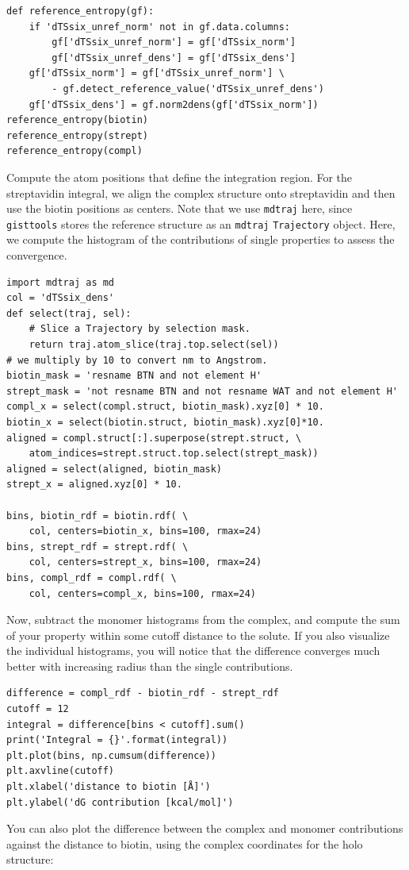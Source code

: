 \documentclass[9pt,tutorial]{livecoms}
\newcommand{\software}{\texttt}
\newcommand\inlinecode{\texttt}
\begin{document}
\begin{lstlisting}[style=python]
def reference_entropy(gf):
    if 'dTSsix_unref_norm' not in gf.data.columns:
        gf['dTSsix_unref_norm'] = gf['dTSsix_norm']
        gf['dTSsix_unref_dens'] = gf['dTSsix_dens']
    gf['dTSsix_norm'] = gf['dTSsix_unref_norm'] \
        - gf.detect_reference_value('dTSsix_unref_dens')
    gf['dTSsix_dens'] = gf.norm2dens(gf['dTSsix_norm'])
reference_entropy(biotin)
reference_entropy(strept)
reference_entropy(compl)
\end{lstlisting}
Compute the atom positions that define the integration region.
For the streptavidin integral, we align the complex structure onto streptavidin and then use the biotin positions as centers. Note that we use \software{mdtraj} here, since \software{gisttools} stores the reference structure as an \software{mdtraj} \inlinecode{Trajectory} object.
Here, we compute the histogram of the contributions of single properties to assess the convergence.

\begin{lstlisting}[style=python]
import mdtraj as md
col = 'dTSsix_dens'
def select(traj, sel):
    # Slice a Trajectory by selection mask.
    return traj.atom_slice(traj.top.select(sel))
# we multiply by 10 to convert nm to Angstrom.
biotin_mask = 'resname BTN and not element H'
strept_mask = 'not resname BTN and not resname WAT and not element H'
compl_x = select(compl.struct, biotin_mask).xyz[0] * 10.
biotin_x = select(biotin.struct, biotin_mask).xyz[0]*10.
aligned = compl.struct[:].superpose(strept.struct, \
    atom_indices=strept.struct.top.select(strept_mask))
aligned = select(aligned, biotin_mask)
strept_x = aligned.xyz[0] * 10.

bins, biotin_rdf = biotin.rdf( \
    col, centers=biotin_x, bins=100, rmax=24)
bins, strept_rdf = strept.rdf( \
    col, centers=strept_x, bins=100, rmax=24)
bins, compl_rdf = compl.rdf( \
    col, centers=compl_x, bins=100, rmax=24)
\end{lstlisting}
Now, subtract the monomer histograms from the complex, and compute the sum of your property within some cutoff distance to the solute.
If you also visualize the individual histograms, you will notice that the difference converges much better with increasing radius than the single contributions.

\begin{lstlisting}[style=python]
difference = compl_rdf - biotin_rdf - strept_rdf
cutoff = 12
integral = difference[bins < cutoff].sum()
print('Integral = {}'.format(integral))
plt.plot(bins, np.cumsum(difference))
plt.axvline(cutoff)
plt.xlabel('distance to biotin [Å]')
plt.ylabel('dG contribution [kcal/mol]')
\end{lstlisting}
You can also plot the difference between the complex and monomer contributions against the distance to biotin, using the complex coordinates for the holo structure:
\end{document}
